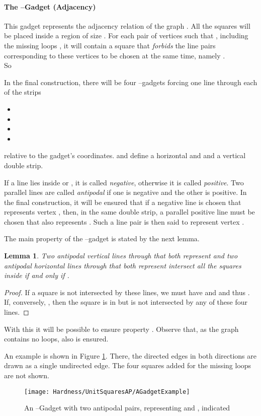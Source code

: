 \documentclass[12pt]{article}
\newtheorem{lemma}[definition]{Lemma}
\begin{document}
\paragraph{The --Gadget (Adjacency)}
This gadget represents the adjacency relation of the graph . All the squares will be placed inside a region of size . For each pair of vertices  such that , including the missing loops , it will contain a square that \textit{forbids} the line pairs corresponding to these vertices to be chosen at the same time, namely .\\
So

In the final construction, there will be four --gadgets forcing one line through each of the strips
\begin{itemize}
	\item  
	\item 
	\item  
	\item 
\end{itemize}
relative to the gadget's coordinates.  and  define a horizontal and  and  a vertical double strip.

If a line  lies inside  or , it is called \textit{negative}, otherwise it is called \textit{positive}. Two parallel lines are called \textit{antipodal} if one is negative and the other is positive. In the final construction, it will be ensured that if a negative line is chosen that represents vertex , then, in the same double strip, a parallel positive line must be chosen that also represents . Such a line pair is then said to represent vertex .

The main property of the --gadget is stated by the next lemma.
\begin{lemma}\label{Lemma:AdjacencyLemma} Two antipodal vertical lines through  that both represent  and two antipodal horizontal lines through  that both represent  intersect all the squares inside  if and only if .
\end{lemma}
\begin{proof}
If a square  is not intersected by these lines, we must have  and  and thus . If, conversely, , then the square  is in  but is not intersected by any of these four lines. 
\end{proof}
With this it will be possible to ensure property . Observe that, as the graph contains no loops, also  is ensured.

An example is shown in Figure \ref{fig:AGadgetExample}. There, the directed edges in both directions are drawn as a single undirected edge. The four squares added for the missing loops are not shown.  
\begin{figure}
	\centering
		\texttt{[image: Hardness/UnitSquaresAP/AGadgetExample]}
	\caption{An --Gadget with two antipodal pairs, representing  and , indicated}
	\label{fig:AGadgetExample}
\end{figure}
\end{document}
